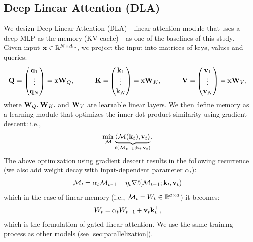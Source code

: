\subsection{Deep Linear Attention (DLA)}
We design Deep Linear Attention (DLA)—linear attention module that uses a deep MLP as the memory (KV cache)—as one of the baselines of this study. Given input $\mathbf{x} \in \mathbb{R}^{N \times  d_{\text{in}}}$, we project the input into matrices of keys, values and queries:
\begin{align}
    \mathbf{Q} = \begin{pmatrix} \mathbf{q}_1 \\ \vdots \\ \mathbf{q}_N
    \end{pmatrix}= \mathbf{x} \mathbf{W}_{Q}, \qquad \quad \mathbf{K} = \begin{pmatrix} \mathbf{k}_1 \\ \vdots \\ \mathbf{k}_N
    \end{pmatrix} = \mathbf{x} \mathbf{W}_{K}, \qquad \quad  \mathbf{V} = \begin{pmatrix} \mathbf{v}_1 \\ \vdots \\ \mathbf{v}_N
    \end{pmatrix} = \mathbf{x} \mathbf{W}_{V},
\end{align}
where $\mathbf{W}_{Q}, \mathbf{W}_{K},$ and $\mathbf{W}_{V}$ are learnable linear layers. We then define memory as  a learning module that optimizes the inner-dot product similarity using gradient descent: i.e., 
\begin{align}
    \min_{\mathcal{M}} \underset{\ell(\mathcal{M}_{t-1}; \mathbf{k}_t, \mathbf{v}_t)}{\underbrace{\langle \mathcal{M}(\mathbf{k}_t), \mathbf{v}_t \rangle}}.
\end{align}
The above optimization using gradient descent results in the following recurrence (we also add weight decay with input-dependent parameter $\alpha_t$):
\begin{align}
    \mathcal{M}_{t} = \alpha_t \mathcal{M}_{t-1}  - \eta_t \nabla \ell(\mathcal{M}_{t-1}; \mathbf{k}_t, \mathbf{v}_t)
\end{align}
which in the case of linear memory (i.e., $\mathcal{M}_t = W_t \in \mathbb{R}^{d \times d}$) it becomes:
\begin{align}
    W_{t} = \alpha_t W_{t-1} + \mathbf{v}_t \mathbf{k}_t^{\top},
\end{align}
which is the formulation of gated linear attention. We use the same training process as other models (see \autoref{sec:parallelization}).

